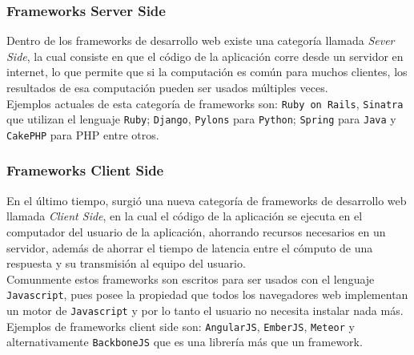 \subsubsection{Frameworks Server Side} %
\label{ssub:frameworks_server_side}
Dentro de los frameworks de desarrollo web existe una categoría llamada \emph{Sever Side}, la cual consiste en que el código de la aplicación corre desde un servidor en internet, lo que permite que si la computación es común para muchos clientes, los resultados de esa computación pueden ser usados múltiples veces.\\

Ejemplos actuales de esta categoría de frameworks son: \texttt{Ruby on Rails}, \texttt{Sinatra} que utilizan el lenguaje \texttt{Ruby}; \texttt{Django}, \texttt{Pylons} para \texttt{Python}; \texttt{Spring} para \texttt{Java} y \texttt{CakePHP} para PHP entre otros.

\subsubsection{Frameworks Client Side} %
\label{ssub:frameworks_client_side}
En el último tiempo, surgió una nueva categoría de frameworks de desarrollo web llamada \emph{Client Side}, en la cual el código de la aplicación se ejecuta en el computador del usuario de la aplicación, ahorrando recursos necesarios en un servidor, además de ahorrar el tiempo de latencia entre el cómputo de una respuesta y su transmisión al equipo del usuario.\\

Comunmente estos frameworks son escritos para ser usados con el lenguaje \texttt{Javascript}, pues posee la propiedad que todos los navegadores web implementan un motor de \texttt{Javascript} y por lo tanto el usuario no necesita instalar nada más. Ejemplos de frameworks client side son: \texttt{AngularJS}, \texttt{EmberJS}, \texttt{Meteor} y alternativamente \texttt{BackboneJS} que es una librería más que un framework.




